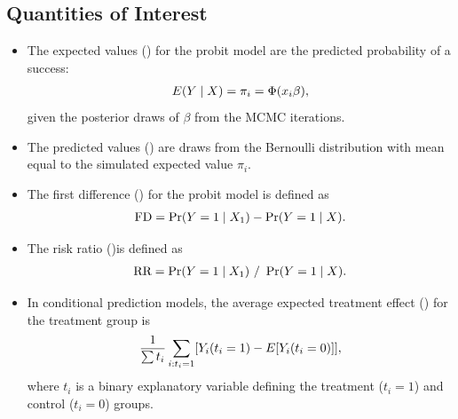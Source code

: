 \documentclass[letterpaper,10pt,english]{sphinxmanual}
\begin{document}
\subsection{Quantities of Interest}
\label{vignette:id105}\begin{itemize}
\item {} 
The expected values () for the probit model are the
predicted probability of a success:
\begin{gather}
\begin{split}\begin{aligned}
E(Y \mid X) = \pi_{i}= \Phi(x_i \beta),\end{aligned}\end{split}\notag
\end{gather}
given the posterior draws of \(\beta\) from the MCMC iterations.

\item {} 
The predicted values () are draws from the Bernoulli
distribution with mean equal to the simulated expected value
\(\pi_{i}\).

\item {} 
The first difference () for the probit model is defined as
\begin{gather}
\begin{split}\begin{aligned}
\text{FD}=\Pr(Y=1\mid X_{1})-\Pr(Y=1\mid X).\end{aligned}\end{split}\notag
\end{gather}
\item {} 
The risk ratio ()is defined as
\begin{gather}
\begin{split}\begin{aligned}
\text{RR}=\Pr(Y=1\mid X_{1})\ /\ \Pr(Y=1\mid X).\end{aligned}\end{split}\notag
\end{gather}
\item {} 
In conditional prediction models, the average expected treatment
effect () for the treatment group is
\begin{gather}
\begin{split}\begin{aligned}
\frac{1}{\sum t_{i}}\sum_{i:t_{i}=1}[Y_{i}(t_{i}=1)-E[Y_{i}(t_{i}=0)]],\end{aligned}\end{split}\notag
\end{gather}
where \(t_{i}\) is a binary explanatory variable defining the
treatment (\(t_{i}=1\)) and control (\(t_{i}=0\)) groups.


\end{itemize}
\end{document}
